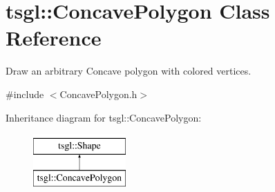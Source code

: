 \hypertarget{classtsgl_1_1_concave_polygon}{}\section{tsgl\+:\+:Concave\+Polygon Class Reference}
\label{classtsgl_1_1_concave_polygon}


Draw an arbitrary Concave polygon with colored vertices.  




{\ttfamily \#include $<$Concave\+Polygon.\+h$>$}

Inheritance diagram for tsgl\+:\+:Concave\+Polygon\+:\begin{figure}[H]
\begin{center}
\leavevmode
\includegraphics[height=2.000000cm]{classtsgl_1_1_concave_polygon}
\end{center}
\end{figure}
